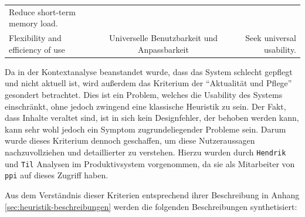 \documentclass[
  12pt,
  ngerman,
  a4paper,
]{article}
\begin{document}
\begin{longtable}[]{@{}lcr@{}}
\begin{minipage}[t]{0.30\columnwidth}
Reduce short-term memory load.\strut
\end{minipage}\tabularnewline
\begin{minipage}[t]{0.30\columnwidth}\raggedright
Flexibility and efficiency of use\strut
\end{minipage} & \begin{minipage}[t]{0.31\columnwidth}\centering
Universelle Benutzbarkeit und Anpassbarkeit\strut
\end{minipage} & \begin{minipage}[t]{0.30\columnwidth}\raggedleft
Seek universal usability.\strut
\end{minipage}\tabularnewline
\bottomrule
\end{longtable}

Da in der Kontextanalyse beanstandet wurde, dass das System schlecht
gepflegt und nicht aktuell ist, wird außerdem das Kriterium der
``Aktualität und Pflege'' gesondert betrachtet. Dies ist ein Problem,
welches die Usability des Systems einschränkt, ohne jedoch zwingend eine
klassische Heuristik zu sein. Der Fakt, dass Inhalte veraltet sind, ist
in sich kein Designfehler, der behoben werden kann, kann sehr wohl
jedoch ein Symptom zugrundeliegender Probleme sein. Darum wurde dieses
Kriterium dennoch geschaffen, um diese Nutzeraussagen nachzuvollziehen
und detaillierter zu verstehen. Hierzu wurden durch \texttt{Hendrik} und
\texttt{Til} Analysen im Produktivsystem vorgenommen, da sie als
Mitarbeiter von \texttt{ppi} auf dieses Zugriff haben.

Aus dem Verständnis dieser Kriterien entsprechend ihrer Beschreibung in
Anhang \ref{sec:heuristik-beschreibungen} werden die folgenden
Beschreibungen synthetisiert:
\end{document}
